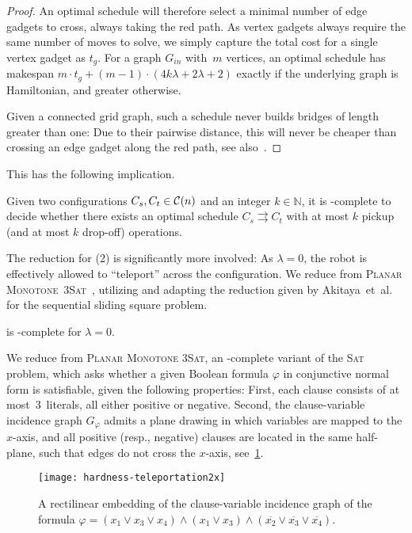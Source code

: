 \begin{proof}
	An optimal schedule will therefore select a minimal number of edge gadgets to cross, always taking the red path.
	As vertex gadgets always require the same number of moves to solve, we simply capture the total cost for a single vertex gadget as $t_g$.
	For a graph $G_{\mathit{in}}$ with~$m$ vertices, an optimal schedule has makespan
	$m\cdot t_g + (m-1)\cdot (4k\lambda+2\lambda+2)$
	exactly if the underlying graph is Hamiltonian, and greater otherwise.

	Given a connected grid graph, such a schedule never builds bridges of length greater than one:
	Due to their pairwise distance, this will never be cheaper than crossing an edge gadget along the red path, see also~\cite{cooperative-bille-reconfig-ICRA}.
\end{proof}

This has the following implication.

\begin{corollary}
	Given two configurations $C_s,C_t\in\mathcal{C}(n)$ and an integer $k\in\mathbb{N}$, it is \NP-complete to decide whether there exists an optimal schedule $C_s\rightrightarrows C_t$ with at most $k$ pickup (and at most $k$ drop-off) operations.
\end{corollary}

The reduction for (2) is significantly more involved: As $\lambda = 0$, the robot is effectively allowed to ``teleport'' across the configuration.
We reduce from \textsc{Planar Monotone~3Sat}~\cite{dbk-obspp-10}, utilizing and adapting the reduction given by Akitaya~et~al.~\cite{AkitayaDKKPSSUW22} for the sequential sliding square problem.
\begin{lemma}
	\label{lem:hardness-lambda-zero}
	\probName is \NP-complete for $\lambda = 0$.
\end{lemma}
We reduce from \textsc{Planar Monotone 3Sat}, an \NP-complete variant of the \textsc{Sat} problem, which asks whether a given Boolean formula $\varphi$ in conjunctive normal form is satisfiable, given the following properties:
First, each clause consists of at most~$3$~literals, all either positive or negative.
Second, the clause-variable incidence graph $G_\varphi$ admits a plane drawing in which variables are mapped to the $x$-axis, and all positive (resp., negative) clauses are located in the same half-plane, such that edges do not cross the $x$-axis, see~\cref{fig:hardness-teleportation-graph}.

\begin{figure}[htb]
	\centering%
	\texttt{[image: hardness-teleportation2x]}%
	\caption{A rectilinear embedding of the clause-variable incidence graph of the formula ${\varphi= (x_1\lor x_3\lor x_4)\land (x_1\lor x_3)\land (\overline{x_2}\lor\overline{x_3}\lor\overline{x_4})}$.}%
	\label{fig:hardness-teleportation-graph}%
\end{figure}

